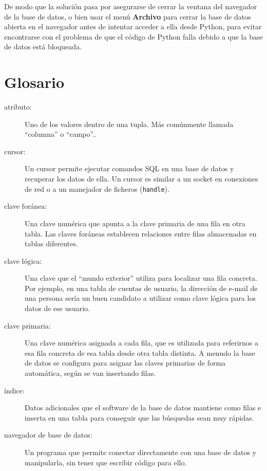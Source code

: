 De modo que la solución pasa por asegurarse de cerrar la ventana del navegador de la base de datos,
o bien usar el menú {\bf Archivo} para cerrar la base de datos abierta en el navegador
antes de intentar acceder a ella desde Python, para evitar encontrarse con
el problema de que el código de Python falla debido a que la base de datos
está bloqueada.

\section{Glosario}

\begin{description}

\item[atributo:] Uno de los valores dentro de una tupla. Más comúnmente
llamada ``columna'' o ``campo''..

\item[cursor:] Un cursor permite ejecutar comandos SQL en una base de datos
y recuperar los datos de ella. Un cursor es similar a un
socket en conexiones de red o a un manejador de ficheros ({\tt handle}).

\item[clave foránea:] Una clave numérica que apunta a la clave primaria de
una fila en otra tabla. Las claves foráneas establecen relaciones entre filas
almacenadas en tablas diferentes.

\item[clave lógica:] Una clave que el ``mundo exterior'' utiliza para localizar una fila
concreta. Por ejemplo, en una tabla de cuentas de usuario, la dirección de e-mail de una persona
sería un buen candidato a utilizar como clave lógica para los datos de ese usuario.

\item[clave primaria:] Una clave numérica asignada a cada fila, que es utilizada para
referirnos a esa fila concreta de esa tabla desde otra tabla distinta. A menudo la base de datos
se configura para asignar las claves primarias de forma automática, según se van insertando filas.

\item[índice:] Datos adicionales que el software de la base de datos mantiene como filas
e inserta en una tabla para conseguir que las búsquedas sean muy rápidas.

\item[navegador de base de datos:]
Un programa que permite conectar directamente con una base de datos
y manipularla, sin tener que escribir código para ello.


\end{description}
